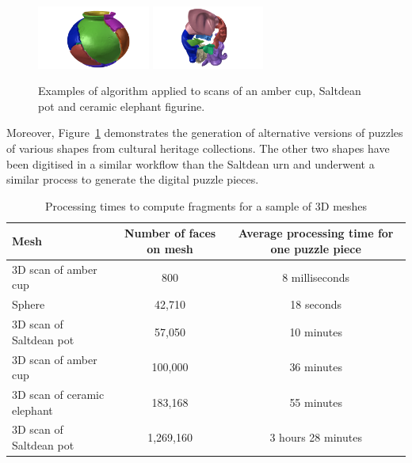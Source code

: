 \documentclass[acmlarge,screen,dvipsnames]{acmart}
\begin{document}
\begin{figure}[htb]
  \includegraphics[width=0.33\textwidth]{images/saltdeanpuzzle4}%
  \includegraphics[width=0.33\textwidth]{images/elephantpuzzle4}
  \caption{\label{fig:three-shapes-with-different-fractures}%
    Examples of algorithm applied to scans of an amber cup, Saltdean pot and
    ceramic elephant figurine.}
\end{figure}

Moreover, Figure~\ref{fig:three-shapes-with-different-fractures}
demonstrates the generation of alternative versions of puzzles of
various shapes from cultural heritage collections. The other two
shapes have been digitised in a similar workflow than the Saltdean urn
and underwent a similar process to generate the digital puzzle pieces.



\begin{table}
  \centering
\greenBegin
\begin{tabular}{ |l|c|c| } 
 \hline
 Mesh & Number of faces on mesh & Average processing time for one puzzle piece
 \\ 
 \hline 
 3D scan of amber cup & \phantom{0,0,0,}800 & 8 milliseconds \\ 
 Sphere & \phantom{0,0}42,710 & 18 seconds \\ 
 3D scan of Saltdean pot & \phantom{0,0}57,050 & 10 minutes \\ 
 3D scan of amber cup & \phantom{0,}100,000 & 36 minutes \\ 
 3D scan of ceramic elephant & \phantom{0,}183,168 & 55 minutes \\ 
 3D scan of Saltdean pot & 1,269,160 & 3 hours 28 minutes \\ 
 \hline
\end{tabular}
\caption{\label{table-procesingtimes} Processing times to compute fragments for a sample of 3D meshes}
\greenEnd
\end{table}
\end{document}
